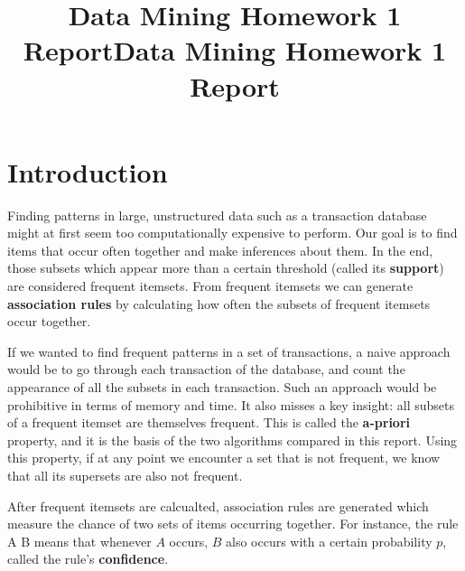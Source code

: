 \documentclass[
  paper=a4,
,captions=tableheading
]{scrartcl}
\title{Data Mining Homework 1 Report}
\date{}
\title{Data Mining Homework 1 Report}
\author{}
\begin{document}
\begin{titlepage}
\newcommand{\colorRule}[3][black]{\textcolor[HTML]{#1}{\rule{#2}{#3}}}
\end{titlepage}
\restoregeometry




\hypertarget{introduction}{%
\section{Introduction}\label{introduction}}

Finding patterns in large, unstructured data such as a transaction
database might at first seem too computationally expensive to perform.
Our goal is to find items that occur often together and make inferences
about them. In the end, those subsets which appear more than a certain
threshold (called its \textbf{support}) are considered frequent
itemsets. From frequent itemsets we can generate \textbf{association
rules} by calculating how often the subsets of frequent itemsets occur
together.

If we wanted to find frequent patterns in a set of transactions, a naive
approach would be to go through each transaction of the database, and
count the appearance of all the subsets in each transaction. Such an
approach would be prohibitive in terms of memory and time. It also
misses a key insight: all subsets of a frequent itemset are themselves
frequent. This is called the \textbf{a-priori} property, and it is the
basis of the two algorithms compared in this report. Using this
property, if at any point we encounter a set that is not frequent, we
know that all its supersets are also not frequent.

After frequent itemsets are calcualted, association rules are generated
which measure the chance of two sets of items occurring together. For
instance, the rule A \Rightarrow B means that whenever \(A\) occurs,
\(B\) also occurs with a certain probability \(p\), called the rule's
\textbf{confidence}.
\end{document}

